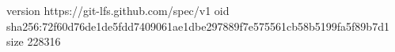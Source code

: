 version https://git-lfs.github.com/spec/v1
oid sha256:72f60d76de1de5fdd7409061ae1dbe297889f7e575561cb58b5199fa5f89b7d1
size 228316
